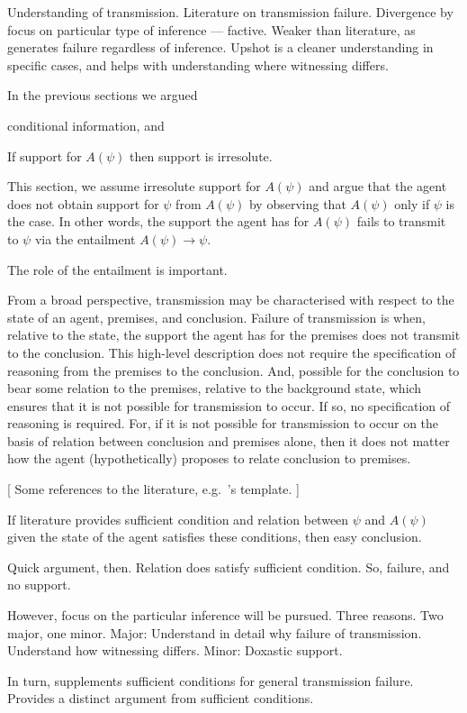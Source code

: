 \documentclass[10pt]{article}
\begin{document}
\begin{note}[Outline]
  Understanding of transmission.
  Literature on transmission failure.
  Divergence by focus on particular type of inference --- factive.
  Weaker than literature, as generates failure regardless of inference.
  Upshot is a cleaner understanding in specific cases, and helps with understanding where witnessing differs.

  In the previous sections we argued
  \begin{enumerate*}
  \item conditional information, and
  \item If support for \(A(\psi)\) then support is irresolute.
  \end{enumerate*}
  This section, we assume irresolute support for \(A(\psi)\) and argue that the agent does not obtain support for \(\psi\) from \(A(\psi)\) by observing that \(A(\psi)\) only if \(\psi\) is the case.
  In other words, the support the agent has for \(A(\psi)\) fails to transmit to \(\psi\) via the entailment \(A(\psi) \rightarrow \psi\).

  The role of the entailment is important.

  From a broad perspective, transmission may be characterised with respect to the state of an agent, premises, and conclusion.
  Failure of transmission is when, relative to the state, the support the agent has for the premises does not transmit to the conclusion.
  This high-level description does not require the specification of reasoning from the premises to the conclusion.
  And, possible for the conclusion to bear some relation to the premises, relative to the background state, which ensures that it is not possible for transmission to occur.
  If so, no specification of reasoning is required.
  For, if it is not possible for transmission to occur on the basis of relation between conclusion and premises alone, then it does not matter how the agent (hypothetically) proposes to relate conclusion to premises.

  {
    [
    \color{red}
    Some references to the literature, e.g.\ \citeauthor{Wright:2003aa}'s template.
    ]
  }

  If literature provides sufficient condition and relation between \(\psi\) and \(A(\psi)\) given the state of the agent satisfies these conditions, then easy conclusion.

  Quick argument, then.
  Relation does satisfy sufficient condition.
  So, failure, and no support.

  However, focus on the particular inference will be pursued.
  Three reasons.
  Two major, one minor.
  Major:
  Understand in detail why failure of transmission.
  Understand how witnessing differs.
  Minor:
  Doxastic support.

  In turn, supplements sufficient conditions for general transmission failure.
  Provides a distinct argument from sufficient conditions.
\end{note}
\end{document}
